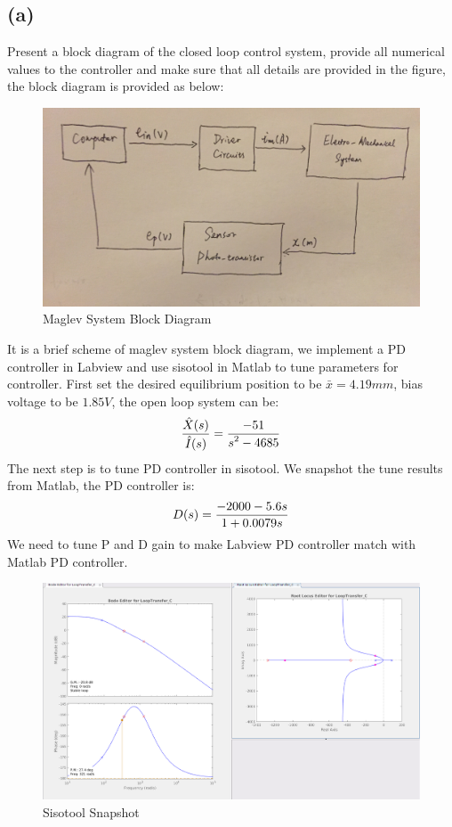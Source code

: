 \documentclass[letterpaper]{article}
\begin{document}
\subsection*{(a)}
Present a block diagram of the closed loop control system, provide all numerical values to the controller and make sure that all details are provided in the figure, the block diagram is provided as below:
\begin{figure}[H]
	\centering
	\includegraphics[scale=0.1]{maglev.jpeg}
	\caption{Maglev System Block Diagram}
\end{figure}
It is a brief scheme of maglev system block diagram, we implement a PD controller in Labview and use sisotool in Matlab to tune parameters for controller. First set the desired equilibrium position to be $\bar{x} = 4.19mm$, bias voltage to be $1.85 V$, the open loop system can be:
$$\frac{\displaystyle \hat{X}(s)}{\displaystyle \hat{I}(s)} = \frac{\displaystyle -51}{\displaystyle s^2 - 4685}$$
The next step is to tune PD controller in sisotool. We snapshot the tune results from Matlab, the PD controller is:
$$D(s) = \frac{\displaystyle -2000-5.6s}{\displaystyle 1+0.0079s}$$
We need to tune P and D gain to make Labview PD controller match with Matlab PD controller.
\begin{figure}[H]
\centering
\includegraphics[scale=0.3]{sisotool.png}
\caption{Sisotool Snapshot }
\end{figure}
\end{document}
